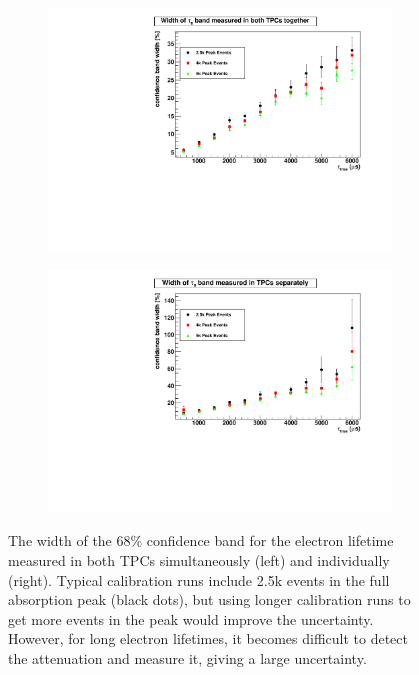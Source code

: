 \documentclass[herrin-thesis.tex]{subfiles}
\begin{document}
\begin{figure}[htbp]
\begin{subfigure}[b]{0.5\linewidth}
\centering
\includegraphics[width=1.0\columnwidth]{./plots/el_sim_width_both.pdf}
\end{subfigure}%
\begin{subfigure}[b]{0.5\linewidth}
\centering
\includegraphics[width=1.0\columnwidth]{./plots/el_sim_width_indiv.pdf}
\end{subfigure}
\caption[Confidence band widths for electron lifetime measurements]{The width of the 68\% confidence band for the electron lifetime measured in both TPCs simultaneously (left) and individually (right). Typical calibration runs include 2.5k events in the full absorption peak (black dots), but using longer calibration runs to get more events in the peak would improve the uncertainty. However, for long electron lifetimes, it becomes difficult to detect the attenuation and measure it, giving a large uncertainty.}
\label{fig:el_sim_width}
\end{figure}
\end{document}
